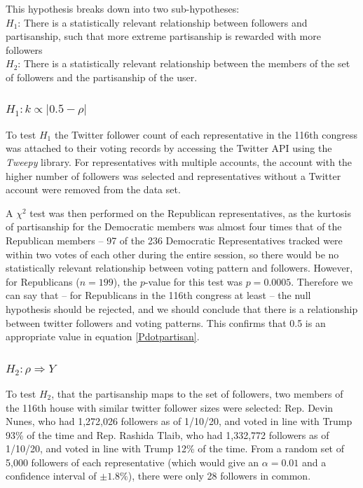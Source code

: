 \documentclass[preprint,review,12pt]{elsarticle}
\begin{document}
This hypothesis breaks down into two sub-hypotheses: \\
\textbf{$H_1$}: There is a statistically relevant relationship between followers and partisanship, such that more extreme partisanship is rewarded with more followers \\
\textbf{$H_2$}: There is a statistically relevant relationship between the members of the set of followers and the partisanship of the user.

 \subsubsection{$H_1: k \propto |0.5 - \rho|$}
  \label{$H_1: k \propto |0.5 - \rho|$}
 To test $H_1$ the Twitter follower count of each representative in the 116th congress was attached to their voting records by accessing the Twitter API using the \textit{Tweepy} library. For representatives with multiple accounts, the account with the higher number of followers was selected and representatives without a Twitter account were removed from the data set. 

A $\chi^2$ test was then performed on the Republican representatives, as the kurtosis of partisanship for the Democratic members was almost four times that of the Republican members -- 97 of the 236 Democratic Representatives tracked were within two votes of each other during the entire session, so there would be no statistically relevant relationship between voting pattern and followers. However, for Republicans ($n = 199$), the $p$-value for this test was $p=0.0005$. Therefore we can say that -- for Republicans in the 116th congress at least -- the null hypothesis should be rejected, and we should conclude that there is a relationship between twitter followers and voting patterns. This confirms that 0.5 is an appropriate value in equation \ref{Pdotpartisan}.

\subsubsection{$H_2: \rho \Rightarrow Y$}
\label{H_2: rho Y}
To test $H_2$, that the partisanship maps to the set of followers, two members of the 116th house with similar twitter follower sizes were selected: Rep. Devin Nunes, who had 1,272,026 followers as of 1/10/20, and voted in line with Trump 93\% of the time and Rep. Rashida Tlaib, who had 1,332,772 followers as of 1/10/20, and voted in line with Trump 12\% of the time. From a random set of 5,000 followers of each representative (which would give an $\alpha = 0.01$ and a confidence interval of $\pm 1.8\%$), there were only 28 followers in common.
\end{document}
